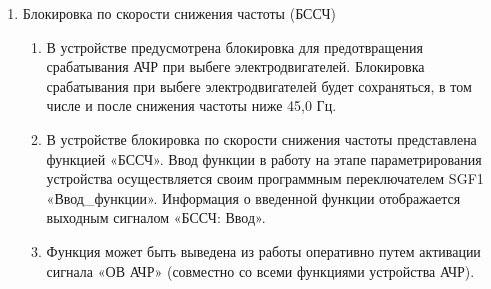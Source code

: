\begin{enumerate}
\begin{enumerate}
\item
Основные характеристики функционального блока:
\begin{itemize}
    \item основная погрешность срабатывания ИО частоты не более 20 мГц;
    \item основная погрешность возврата ИО частоты не более 20 мГц;
    \item основная погрешность срабатывания ИО скорости изменения частоты должна быть не более 150 мГц;
    \item основная погрешность ИО частоты в рабочем диапазоне при напряжении входного сигнала 100 В не более 10 мГц;
    \item время срабатывания и возврата ИО частоты не более 60 мс;
    \item время срабатывания ИО скорости изменения частоты должно быть не более 200 мс.
\end{itemize}

\item
Функциональный блок может быть полностью выведен из работы оперативно путем активации сигнала «ОВ АОСЧ».
\item
В таблице \ref{bssch:tbl} приведены параметры, необходимые для настройки функции.

\end{enumerate}


\item Блокировка по скорости снижения частоты (БССЧ) \label{punktbssch}

\begin{enumerate}

\item
В устройстве предусмотрена блокировка для предотвращения срабатывания АЧР при выбеге электродвигателей. Блокировка срабатывания при выбеге электродвигателей будет сохраняться, в том числе и после снижения частоты ниже 45,0 Гц.

\item 
В устройстве блокировка по скорости снижения частоты представлена функцией «БССЧ». Ввод функции в работу на этапе параметрирования устройства осуществляется своим программным переключателем SGF1 «Ввод\_функции». Информация о введенной функции отображается выходным сигналом «БССЧ: Ввод».

\item
Функция может быть выведена из работы оперативно путем активации сигнала «ОВ АЧР» (совместно со всеми функциями устройства АЧР).


\end{enumerate}
\end{enumerate}
